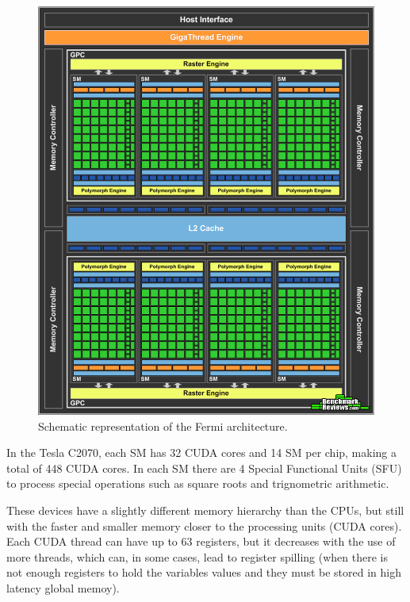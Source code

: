\begin{figure}[!htp]
	\begin{center}
		\includegraphics[scale=0.3]{../../common/img/fermi_arch.png}
		\caption{Schematic representation of the \nvidia Fermi architecture.}
		\label{fig:FermiArchitecture}
	\end{center}
\end{figure}

In the Tesla C2070, each SM has 32 CUDA cores and 14 SM per chip, making a total of 448 CUDA cores. In each SM there are 4 Special Functional Units (SFU) to process special operations such as square roots and trignometric arithmetic.

These devices have a slightly different memory hierarchy than the CPUs, but still with the faster and smaller memory closer to the processing units (CUDA cores). Each CUDA thread can have up to 63 registers, but it decreases with the use of more threads, which can, in some cases, lead to register spilling (when there is not enough registers to hold the variables values and they must be stored in high latency global memoy).

